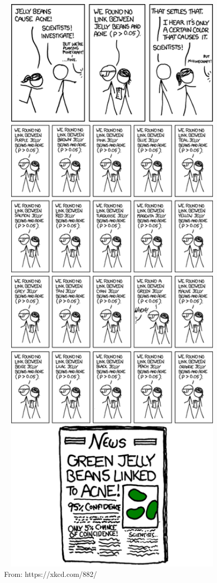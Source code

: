 \documentclass[]{book}
\theoremstyle{definition}
\theoremstyle{definition}
\theoremstyle{definition}
\theoremstyle{remark}
\begin{document}
\begin{figure}

{\centering \includegraphics[width=7.5in]{img/xkcd_mult_test} 

}

\caption{From: https://xkcd.com/882/}\label{fig:unnamed-chunk-5}
\end{figure}
\end{document}
